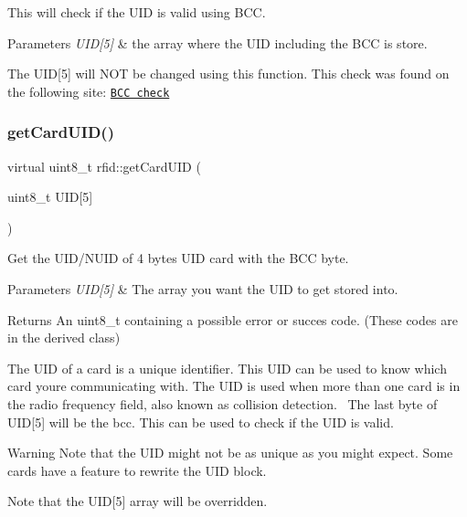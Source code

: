 This will check if the U\+ID is valid using B\+CC. 


\begin{DoxyParams}{Parameters}
{\em U\+I\+D\mbox{[}5\mbox{]}} & the array where the U\+ID including the B\+CC is store.\\
\hline
\end{DoxyParams}
The U\+ID\mbox{[}5\mbox{]} will N\+OT be changed using this function. This check was found on the following site\+: \href{http://www.proxmark.org/forum/viewtopic.php?id=2274}{\tt B\+CC check} \mbox{\label{classrfid_afeb2a321694ceaf84db793f5efb3a750}} 
\subsubsection{\texorpdfstring{get\+Card\+U\+I\+D()}{getCardUID()}}
{\footnotesize\ttfamily virtual uint8\+\_\+t rfid\+::get\+Card\+U\+ID (\begin{DoxyParamCaption}\item[{uint8\+\_\+t}]{U\+ID\mbox{[}5\mbox{]} }\end{DoxyParamCaption})\hspace{0.3cm}{\ttfamily [pure virtual]}}



Get the U\+I\+D/\+N\+U\+ID of 4 bytes U\+ID card with the B\+CC byte. 


\begin{DoxyParams}{Parameters}
{\em U\+I\+D\mbox{[}5\mbox{]}} & The array you want the U\+ID to get stored into. \\
\hline
\end{DoxyParams}
\begin{DoxyReturn}{Returns}
An uint8\+\_\+t containing a possible error or succes code. (These codes are in the derived class)
\end{DoxyReturn}
The U\+ID of a card is a unique identifier. This U\+ID can be used to know which card you\textquotesingle{}re communicating with. The U\+ID is used when more than one card is in the radio frequency field, also known as collision detection.~\newline
 The last byte of U\+ID\mbox{[}5\mbox{]} will be the bcc. This can be used to check if the U\+ID is valid. \begin{DoxyWarning}{Warning}
Note that the U\+ID might not be as unique as you might expect. Some cards have a feature to rewrite the U\+ID block. 

Note that the U\+ID\mbox{[}5\mbox{]} array will be overridden. 
\end{DoxyWarning}


